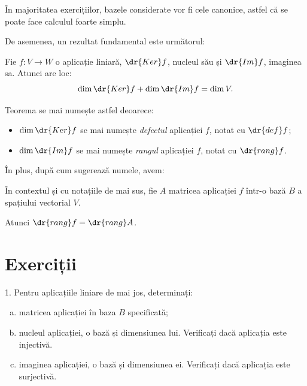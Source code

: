 În majoritatea exercițiilor, bazele considerate vor fi cele canonice, astfel că se poate face
calculul foarte simplu.

De asemenea, un rezultat fundamental este următorul:

\begin{theorem}\label{thm:rang-def}
    Fie $ f : V \to W $ o aplicație liniară, $ \dr{Ker}f $, nucleul său și $ \dr{Im}f $,
    imaginea sa. Atunci are loc:
    \[
        \dim \dr{Ker}f + \dim \dr{Im} f = \dim V.
    \]
\end{theorem}

Teorema se mai numește astfel deoarece:
\begin{itemize}
    \item $ \dim \dr{Ker} f $ se mai numește \emph{defectul} aplicației $ f $, notat
        cu $ \dr{def} f $;
    \item $ \dim \dr{Im} f $ se mai numește \emph{rangul} aplicației $ f $, notat
        cu $ \dr{rang} f $.
\end{itemize}

În plus, după cum sugerează numele, avem:
\begin{theorem}\label{thm:rang-f}
    În contextul și cu notațiile de mai sus, fie $ A $ matricea aplicației $ f $ într-o
    bază $ B $ a spațiului vectorial $ V $.

    Atunci $ \dr{rang} f = \dr{rang} A $.
\end{theorem}


\section{Exerciții}

1. Pentru aplicațiile liniare de mai jos, determinați:
\begin{enumerate}[(a)]
    \item matricea aplicației în baza $ B $ specificată;
    \item nucleul aplicației, o bază și dimensiunea lui. Verificați dacă aplicația este injectivă.
    \item imaginea aplicației, o bază și dimensiunea ei. Verificați dacă aplicația este surjectivă.
\end{enumerate}

